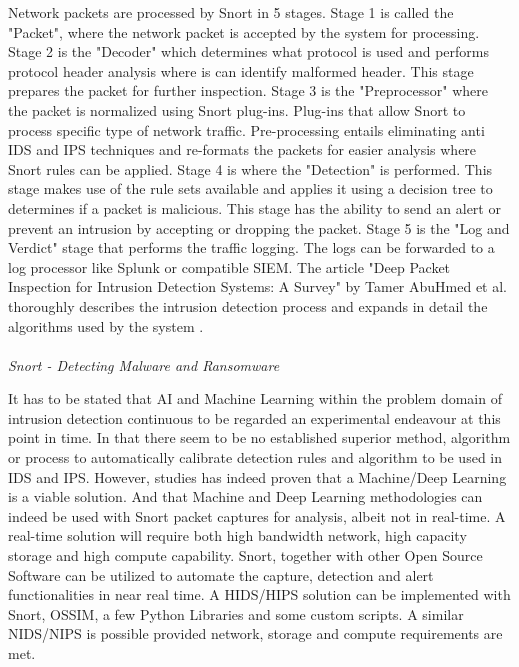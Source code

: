 Network packets are processed by Snort in 5 stages. Stage 1 is called the "Packet", where the network packet is accepted by the system for processing. Stage 2 is the "Decoder" which determines what protocol is used and performs protocol header analysis where is can identify malformed header. This stage prepares the packet for further inspection. Stage 3 is the "Preprocessor" where the packet is normalized using Snort plug-ins. Plug-ins that allow Snort to process specific type of network traffic. Pre-processing entails eliminating anti IDS and IPS techniques and re-formats the packets for easier analysis where Snort rules can be applied. Stage 4 is where the "Detection" is performed. This stage makes use of the rule sets available and applies it using a decision tree to determines if a packet is malicious. This stage has the ability to send an alert or prevent an intrusion by accepting or dropping the packet. Stage 5 is the "Log and Verdict" stage that performs the traffic logging. The logs can be forwarded to a log processor like Splunk or compatible SIEM. The article "Deep Packet Inspection for Intrusion Detection Systems: A Survey" by Tamer AbuHmed et al. thoroughly describes the intrusion detection process and expands in detail the algorithms used by the system \cite{Tamer_et_al2008_Deep_Packet_Inspections}.\\
\\
\textit{Snort - Detecting Malware and Ransomware}

It has to be stated that AI and Machine Learning within the problem domain of intrusion detection continuous to be regarded an experimental\cite{Parisi2019} endeavour at this point in time. In that there seem to be no established superior method, algorithm or process to automatically calibrate detection rules and algorithm to be used in IDS and IPS. However, studies has indeed proven that a Machine/Deep Learning is a viable solution. And that Machine and Deep Learning methodologies can indeed be used with Snort packet captures for analysis, albeit not in real-time. A real-time solution will require both high bandwidth network, high capacity storage and high compute capability. Snort, together with other Open Source Software can be utilized to automate the capture, detection and alert functionalities in near real time. A HIDS/HIPS solution can be implemented with Snort, OSSIM, a few Python Libraries and some custom scripts. A similar NIDS/NIPS is possible provided network, storage and compute requirements are met.
\\

